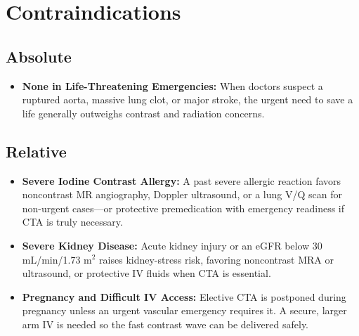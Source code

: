 \section{Contraindications}

\subsection{Absolute}
\begin{itemize}
    \item \textbf{None in Life-Threatening Emergencies:} When doctors suspect a ruptured aorta, massive lung clot, or major stroke, the urgent need to save a life generally outweighs contrast and radiation concerns.
\end{itemize}

\subsection{Relative}
\begin{itemize}
    \item \textbf{Severe Iodine Contrast Allergy:} A past severe allergic reaction favors noncontrast MR angiography, Doppler ultrasound, or a lung V/Q scan for non-urgent cases---or protective premedication with emergency readiness if CTA is truly necessary.
    \item \textbf{Severe Kidney Disease:} Acute kidney injury or an eGFR below 30 mL/min/1.73 m$^2$ raises kidney-stress risk, favoring noncontrast MRA or ultrasound, or protective IV fluids when CTA is essential.
    \item \textbf{Pregnancy and Difficult IV Access:} Elective CTA is postponed during pregnancy unless an urgent vascular emergency requires it. A secure, larger arm IV is needed so the fast contrast wave can be delivered safely.
\end{itemize}

